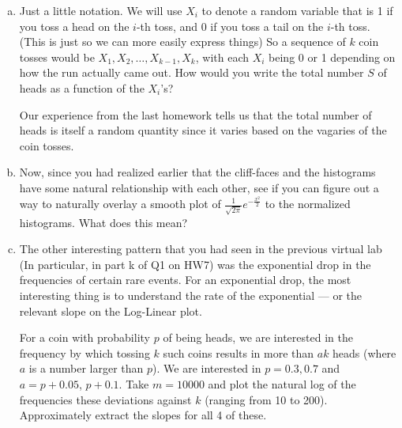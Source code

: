 \documentclass[]{article}
\newif\ifsolutions
\renewcommand{\answer}[1]{{\color{mydarkblue}\textbf{Solution:}#1}}
\begin{document}
\begin{qunlist}
\begin{enumerate}[a)]
\qpart
\item Just a little notation. We will use $X_i$ to denote a random
  variable that is 1 if you toss a head on the $i$-th toss, and 0 if you toss a
  tail on the $i$-th toss. (This is just so we can more easily express 
  things) So a sequence of $k$ coin tosses would be $X_1, X_2, \ldots,
  X_{k-1}, X_k$, with each $X_i$ being 0 or 1 depending on how the run
  actually came out. How would you write the total number $S$ of heads
  as a function of the $X_i$'s? 

 Our experience from the last homework tells us that the total number
 of heads is itself a random quantity since it varies based on the
 vagaries of the coin tosses.

\ifsolutions{ \answer { We can write $S_k$ as
\[ S_k = \sum_{i=1}^k X_i. \]
where the subscript $k$ denotes the number of coin flips.
}}\fi



\qpart 
\item Now, since you had realized earlier that the cliff-faces and the
  histograms have some natural relationship with each other, see if
  you can figure out a way to naturally overlay a smooth plot of
  $\frac{1}{\sqrt{2\pi}} e^{-\frac{x^2}{2}}$ to the normalized
  histograms. What does this mean?

\ifsolutions{ \answer { By normalizing the histograms by area so that the sum of the heights of all the bars equals 1, we can overlay the function above very nicely. This suggests that integrating these histograms will yield the cliff-face shapes plotted in part (a). It also suggests that the probability of getting certain numbers of heads is related to the normal distribution.

\begin{figure}[h!]
\center
\texttt{[image: figures/part\_c.png]}
\end{figure}
}}\fi


\newpage

\qpart
\item The other interesting pattern that you had seen in the previous
  virtual lab (In particular, in part k of Q1 on HW7) was the
  exponential drop in the frequencies of certain rare events. For an
  exponential drop, the most interesting thing is to understand the
  rate of the exponential --- or the relevant slope on the Log-Linear
  plot.  

  For a coin with probability $p$ of being heads, we are interested in
  the frequency by which tossing $k$ such coins results in more than
  $ak$ heads (where $a$ is a number larger than $p$). We are
  interested in $p=0.3,0.7$ and $a = p+0.05$,
  $p+0.1$.  Take $m = 10000$ and plot the natural log of the frequencies 
  these deviations against $k$ (ranging from 10 to 200). Approximately
  extract the slopes for all 4 of these.


\end{enumerate}
\end{qunlist}
\end{document}
